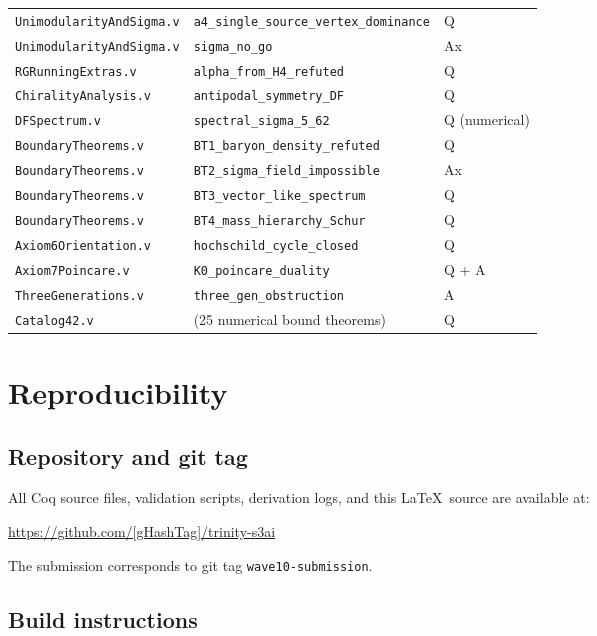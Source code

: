 \documentclass[12pt,a4paper]{article}
\begin{document}
\begin{longtable}{lll}
  \texttt{UnimodularityAndSigma.v} & \texttt{a4\_single\_source\_vertex\_dominance} & Q \\
  \texttt{UnimodularityAndSigma.v} & \texttt{sigma\_no\_go} & Ax \\
  \texttt{RGRunningExtras.v} & \texttt{alpha\_from\_H4\_refuted} & Q \\
  \texttt{ChiralityAnalysis.v} & \texttt{antipodal\_symmetry\_DF} & Q \\
  \texttt{DFSpectrum.v} & \texttt{spectral\_sigma\_5\_62} & Q (numerical) \\
  \texttt{BoundaryTheorems.v} & \texttt{BT1\_baryon\_density\_refuted} & Q \\
  \texttt{BoundaryTheorems.v} & \texttt{BT2\_sigma\_field\_impossible} & Ax \\
  \texttt{BoundaryTheorems.v} & \texttt{BT3\_vector\_like\_spectrum} & Q \\
  \texttt{BoundaryTheorems.v} & \texttt{BT4\_mass\_hierarchy\_Schur} & Q \\
  \texttt{Axiom6Orientation.v} & \texttt{hochschild\_cycle\_closed} & Q \\
  \texttt{Axiom7Poincare.v} & \texttt{K0\_poincare\_duality} & Q + A \\
  \texttt{ThreeGenerations.v} & \texttt{three\_gen\_obstruction} & A \\
  \texttt{Catalog42.v} & (25 numerical bound theorems) & Q \\
\end{longtable}


\section{Reproducibility}
\label{app:repro}

\subsection{Repository and git tag}

All Coq source files, validation scripts, derivation logs, and this \LaTeX\ source
are available at:
\begin{center}
\url{https://github.com/[gHashTag]/trinity-s3ai}
\end{center}
The submission corresponds to git tag \texttt{wave10-submission}.

\subsection{Build instructions}
\end{document}
